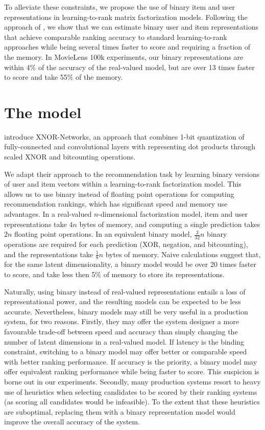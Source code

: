 \documentclass[sigchi]{acmart}
\begin{document}
To alleviate these constraints, we propose the use of binary item and user representations in learning-to-rank matrix factorization models. Following the approach of \citet{rastegari2016xnor}, we show that we can estimate binary user and item representations that achieve comparable ranking accuracy to standard learning-to-rank approaches while being several times faster to score and requiring a fraction of the memory. In MovieLens 100k experiments, our binary representations are within 4\% of the accuracy of the real-valued model, but are over 13 times faster to score and take 55\% of the memory.

\section{The model}
\label{sec:approach}
\citet{rastegari2016xnor} introduce XNOR-Networks, an approach that combines 1-bit quantization of fully-connected and convolutional layers with representing dot products through scaled XNOR and bitcounting operations.

We adapt their approach to the recommendation task by learning binary versions of user and item vectors within a learning-to-rank factorization model. This allows us to use binary instead of floating point operations for computing recommendation rankings, which has significant speed and memory use advantages. In a real-valued $n$-dimensional factorization model, item and user representations take $4n$ bytes of memory, and computing a single prediction takes $2n$ floating point operations. In an equivalent binary model, $\frac{3}{32}n$ binary operations are required for each prediction (XOR, negation, and bitcounting), and the representations take $\frac{1}{8}n$ bytes of memory. Naive calculations suggest that, for the same latent dimensionality, a binary model would be over 20 times faster to score, and take less then 5\% of memory to store its representations.

Naturally, using binary instead of real-valued representations entails a loss of representational power, and the resulting models can be expected to be less accurate. Nevertheless, binary models may still be very useful in a production system, for two reasons. Firstly, they may offer the system designer a more favourable trade-off between speed and accuracy than simply changing the number of latent dimensions in a real-valued model. If latency is the binding constraint, switching to a binary model may offer better or comparable speed with better ranking performance. If accuracy is the priority, a binary model may offer equivalent ranking performance while being faster to score. This suspicion is borne out in our experiments. Secondly, many production systems resort to heavy use of heuristics when selecting candidates to be scored by their ranking systems (as scoring all candidates would be infeasible). To the extent that these heuristics are suboptimal, replacing them with a binary representation model would improve the overall accuracy of the system.
\end{document}

